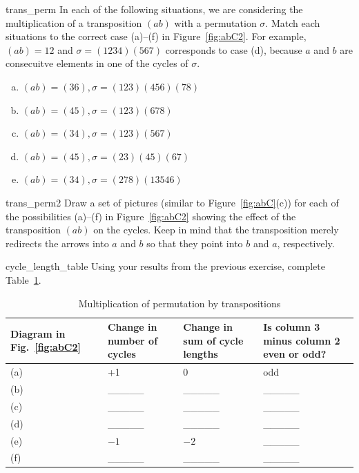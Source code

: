 \begin{exercise}{trans_perm}
In each of the following situations, we are considering the multiplication of a transposition $(ab)$ with a permutation $\sigma$. Match each situations to the  correct case (a)--(f) in Figure~\ref{fig:abC2}. For example, $(ab)=12$ and $\sigma = (1234)(567)$ corresponds to case (d), because $a$ and $b$ are consecuitve elements in one of the cycles of $\sigma$.  
\begin{enumerate}[(a)]
\item
$(ab) = (36), \sigma = (123)(456)(78)$
\item
$(ab) = (45), \sigma = (123)(678)$
\item
$(ab) = (34), \sigma = (123) (567)$
\item
$(ab) = (45), \sigma = (23)(45)(67)$
\item
$(ab) = (34), \sigma = (278)(13546)$
\end{enumerate}
\end{exercise}


\begin{exercise}{trans_perm2}
Draw  a set of pictures (similar to Figure~\ref{fig:abC}(c)) for each of the possibilities (a)--(f) in Figure~\ref{fig:abC2} showing the effect of the transposition $(ab)$ on the cycles.   Keep in mind that the transposition merely redirects the arrows into $a$ and $b$ so that they point into $b$ and $a$, respectively.
\end{exercise}

\begin{exercise}{cycle_length_table}
Using your results from the previous exercise, complete Table~\ref{transposition_table}.
\end{exercise}

\begin{table}[!htb]
\caption{Multiplication of permutation by transpositions}\label{transposition_table}
\begin{tabular}{|p{1.6cm}|p{2.7cm}|p{2.7cm}|p{3.5cm}|}
\hline 
\rule{0pt}{2.6ex} Diagram in Fig.~\ref{fig:abC2}&  Change in number of cycles   & Change in sum of cycle lengths & Is column 3 minus column 2 even or odd?  \rule[-1.2ex]{0pt}{0pt} \tabularnewline
\hline
\hline 
\rule{0pt}{2.6ex} (a)  &  +1  & 0  & odd \rule[-1.2ex]{0pt}{0pt} \tabularnewline
\hline 
\rule{0pt}{2.6ex} (b)  &  \_\_\_\_\_ & \_\_\_\_\_ & \_\_\_\_\_ \rule[-1.2ex]{0pt}{0pt} \tabularnewline
\hline 
\rule{0pt}{2.6ex} (c)  &  \_\_\_\_\_ & \_\_\_\_\_  & \_\_\_\_\_ \rule[-1.2ex]{0pt}{0pt} \tabularnewline
\hline 
\rule{0pt}{2.6ex} (d)  &  \_\_\_\_\_ & \_\_\_\_\_  & \_\_\_\_\_ \rule[-1.2ex]{0pt}{0pt} \tabularnewline
\hline 
\rule{0pt}{2.6ex} (e)  & $-1$ & $-2$ & \_\_\_\_\_ \rule[-1.2ex]{0pt}{0pt} \tabularnewline
\hline 
\rule{0pt}{2.6ex} (f)  &  \_\_\_\_\_ & \_\_\_\_\_ & \_\_\_\_\_  \rule[-1.2ex]{0pt}{0pt} \tabularnewline
\hline 
\end{tabular}
\end{table}

